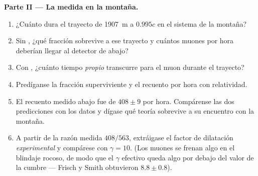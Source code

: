 \begin{problem}
\medskip\noindent\textbf{Parte II --- La medida en la montaña.}
\begin{enumerate}[resume]
  \item ¿Cuánto dura el trayecto de \qty{1907}{m} a $0.995c$ en el
        sistema de la montaña?
  \item Sin , ¿qué fracción sobrevive a ese
        trayecto y cuántos muones por hora deberían llegar al detector
        de abajo?
  \item Con , ¿cuánto tiempo \emph{propio}
        transcurre para el muon durante el trayecto?
  \item Predíganse la fracción superviviente y el recuento por hora con
        relatividad.
  \item El recuento medido abajo fue de $408 \pm 9$ por hora. Compárense
        las dos predicciones con los datos y dígase qué teoría sobrevive
        a su encuentro con la montaña.
  \item A partir de la razón medida $408/563$, extráigase el factor de
        dilatación \emph{experimental} y compárese con $\gamma = 10$.
        (Los muones se frenan algo en el blindaje rocoso, de modo que
        el $\gamma$ efectivo queda algo por debajo del valor de la
        cumbre --- Frisch y Smith obtuvieron $8.8 \pm
        0.8$).
\end{enumerate}


\end{problem}
